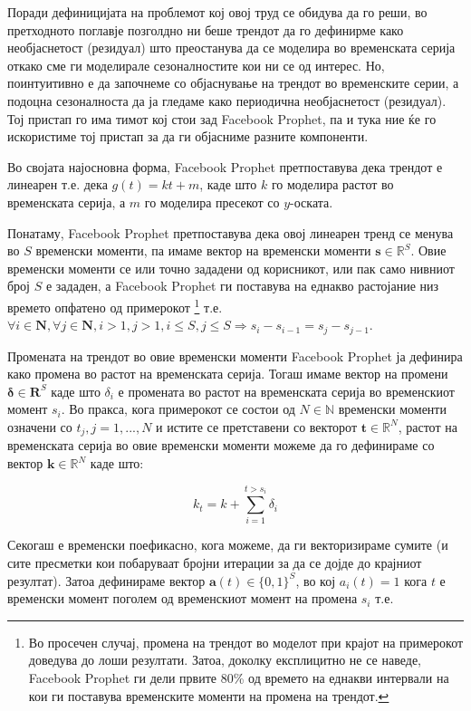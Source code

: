 \documentclass[12pt]{article}
\numberwithin{equation}{section}
\begin{document}
Поради дефиницијата на проблемот кој овој труд се обидува да го реши, во претходното поглавје позголдно ни беше трендот да го дефинирме како необјаснетост (резидуал) што преостанува да се моделира во временската серија откако сме ги моделирале сезоналностите кои ни се од интерес. Но, поинтуитивно е да започнеме со објаснување на трендот во временските серии, а подоцна сезоналноста да ја гледаме како периодична необјаснетост (резидуал). Тој пристап го има тимот кој стои зад Facebook Prophet, па и тука ние ќе го искористиме тој пристап за да ги објасниме разните компоненти.

Во својата најосновна форма, Facebook Prophet претпоставува дека трендот е линеарен т.е. дека \(g(t) = kt + m\), каде што \(k\) го моделира растот во временската серија, а \(m\) го моделира пресекот со \(y\)-оската.

Понатаму, Facebook Prophet претпоставува дека овој линеарен тренд се менува во \(S\) временски моменти, па имаме вектор на временски моменти \(\boldsymbol{s} \in \mathbb{R} ^ S\). Овие временски моменти се или точно зададени од корисникот, или пак само нивниот број \(S\) е зададен, а Facebook Prophet ги поставува на еднакво растојание низ времето опфатено од примерокот \footnote{Во просечен случај, промена на трендот во моделот при крајот на примерокот доведува до лоши резултати. Затоа, доколку експлицитно не се наведе, Facebook Prophet ги дели првите 80\% од времето на еднакви интервали на кои ги поставува временските моменти на промена на трендот.} т.е. \(\forall i \in \mathbf{N}, \forall j \in \mathbf{N}, i > 1, j > 1, i \leq S, j \leq S \Rightarrow s_i - s_{i-1} = s_j - s_{j-1}\).

Промената на трендот во овие временски моменти Facebook Prophet ја дефинира како промена во растот на временската серија. Тогаш имаме вектор на промени \(\boldsymbol{\delta} \in \mathbf{R}^S\) каде што \(\delta_i\) е промената во растот на временската серија во временскиот момент \(s_i\). Во пракса, кога примерокот се состои од \(N \in \mathbb{N}\) временски моменти означени со \(t_j, j = 1, ..., N\) и истите се претставени со векторот \(\boldsymbol{t} \in \mathbb{R}^N\), растот на временската серија во овие временски моменти можеме да го дефинираме со вектор \(\boldsymbol{k} \in \mathbb{R}^N\) каде што:

\begin{equation}\label{slope_slow}
k_t = k + \sum_{i=1}^{t>s_i} \delta_i
\end{equation}

Секогаш е временски поефикасно, кога можеме, да ги векторизираме сумите (и сите пресметки кои побаруваат бројни итерации за да се дојде до крајниот резултат). Затоа дефинираме вектор \(\boldsymbol{a}(t) \in \{0, 1\}^S\), во кој \(a_i(t) = 1\) кога \(t\) е временски момент поголем од временскиот момент на промена \(s_i\) т.е.
\end{document}
